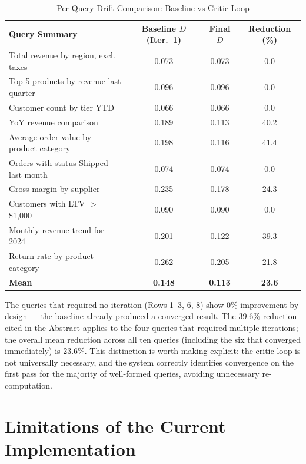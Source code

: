 \documentclass[12pt,a4paper]{report}
\begin{document}
\begin{table}[H]
  \centering
  \caption{Per-Query Drift Comparison: Baseline vs Critic Loop}
  \label{tab:baseline-comparison}
  \renewcommand{\arraystretch}{1.3}
  \begin{tabularx}{\textwidth}{@{}Xccc@{}}
    \toprule
    \textbf{Query Summary} & \textbf{Baseline $D$ (Iter.~1)} & \textbf{Final $D$} & \textbf{Reduction (\%)} \\
    \midrule
    Total revenue by region, excl. taxes   & 0.073 & 0.073 & 0.0  \\
    Top 5 products by revenue last quarter & 0.096 & 0.096 & 0.0  \\
    Customer count by tier YTD             & 0.066 & 0.066 & 0.0  \\
    YoY revenue comparison                 & 0.189 & 0.113 & 40.2 \\
    Average order value by product category & 0.198 & 0.116 & 41.4 \\
    Orders with status Shipped last month  & 0.074 & 0.074 & 0.0  \\
    Gross margin by supplier               & 0.235 & 0.178 & 24.3 \\
    Customers with LTV $>$ \$1,000         & 0.090 & 0.090 & 0.0  \\
    Monthly revenue trend for 2024         & 0.201 & 0.122 & 39.3 \\
    Return rate by product category        & 0.262 & 0.205 & 21.8 \\
    \midrule
    \textbf{Mean}                           & \textbf{0.148} & \textbf{0.113} & \textbf{23.6} \\
    \bottomrule
  \end{tabularx}
\end{table}

The queries that required no iteration (Rows 1--3, 6, 8) show 0\% improvement by design — the baseline already produced a converged result. The 39.6\% reduction cited in the Abstract applies to the four queries that required multiple iterations; the overall mean reduction across all ten queries (including the six that converged immediately) is 23.6\%. This distinction is worth making explicit: the critic loop is not universally necessary, and the system correctly identifies convergence on the first pass for the majority of well-formed queries, avoiding unnecessary re-computation.

\section{Limitations of the Current Implementation}
\label{sec:limitations}
\end{document}
